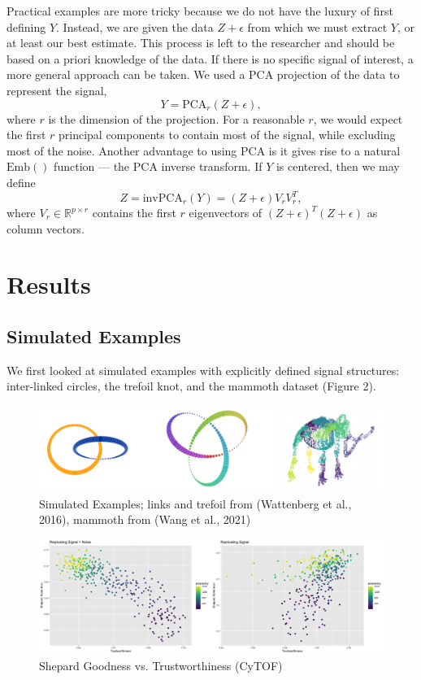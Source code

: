 \documentclass[webpdf,modern,large,namedate]{oup-authoring-template}
\theoremstyle{thmstyleone}%
\theoremstyle{thmstyletwo}%
\theoremstyle{thmstylethree}%
\begin{document}
Practical examples are more tricky because we do not have the luxury of first defining $Y$. Instead, we are given the data $Z + \epsilon$ from which we must extract $Y$, or at least our best estimate. This process is left to the researcher and should be based on a priori knowledge of the data. If there is no specific signal of interest, a more general approach can be taken. We used a PCA projection of the data to represent the signal, $$Y = \textrm{PCA}_r(Z + \epsilon),$$ where $r$ is the dimension of the projection. For a reasonable $r$, we would expect the first $r$ principal components to contain most of the signal, while excluding most of the noise. Another advantage to using PCA is it gives rise to a natural $\textrm{Emb}()$ function --- the PCA inverse transform. If $Y$ is centered, then we may define $$Z = \textrm{invPCA}_r(Y) = (Z + \epsilon)V_rV_r^T,$$ where $V_r \in \mathbb{R}^{p \times r}$ contains the first $r$ eigenvectors of $(Z+\epsilon)^T(Z+\epsilon)$ as column vectors.

\section{Results}

\subsection{Simulated Examples}
We first looked at simulated examples with explicitly defined signal structures: inter-linked circles, the trefoil knot, and the mammoth dataset (Figure 2).

\renewcommand{\thefigure}{2}
\begin{figure}[H]
\centering
\includegraphics[scale=0.2]{simulated examples}
\caption{Simulated Examples; links and trefoil from (Wattenberg et al., 2016), mammoth from (Wang et al., 2021)}
\end{figure}

\renewcommand{\thefigure}{4a}
\begin{figure}[b]
\includegraphics[scale=0.28]{CyTOF plot}
\centering
\caption{Shepard Goodness vs. Trustworthiness (CyTOF)}
\end{figure}
\end{document}
